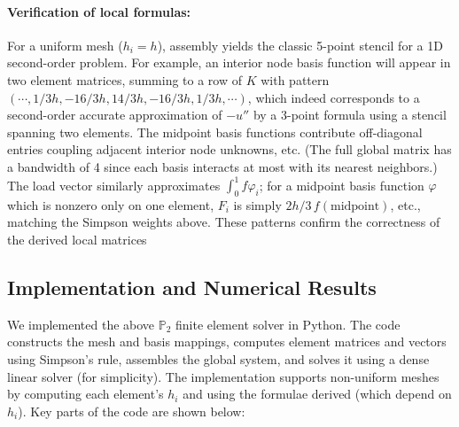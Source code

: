 \documentclass[a4paper,10pt]{article}
\begin{document}
\paragraph{Verification of local formulas:}
For a uniform mesh (\(h_i=h\)), assembly yields the classic 5-point stencil for a 1D second-order problem.
For example, an interior node basis function will appear in two element matrices, summing to a row of \(K\) with pattern \((\cdots, 1/3h, -16/3h, 14/3h, -16/3h, 1/3h,\cdots)\), which indeed corresponds to a second-order accurate approximation of \(-u''\) by a 3-point formula using a stencil spanning two elements.
The midpoint basis functions contribute off-diagonal entries coupling adjacent interior node unknowns, etc. (The full global matrix has a bandwidth of 4 since each basis interacts at most with its nearest neighbors.)
The load vector similarly approximates \(\int_0^1 f\varphi_i\); for a midpoint basis function \(\varphi\) which is nonzero only on one element, \(F_i\) is simply \(2h/3\,f(\text{midpoint})\), etc., matching the Simpson weights above.
These patterns confirm the correctness of the derived local matrices

\subsection{Implementation and Numerical Results}

We implemented the above \(\mathbb{P}_2 \) finite element solver in Python.
The code constructs the mesh and basis mappings, computes element matrices and vectors using Simpson's rule, assembles the global system, and solves it using a dense linear solver (for simplicity).
The implementation supports non-uniform meshes by computing each element’s \(h_i\) and using the formulae derived (which depend on \(h_i\)).
Key parts of the code are shown below:
\end{document}
